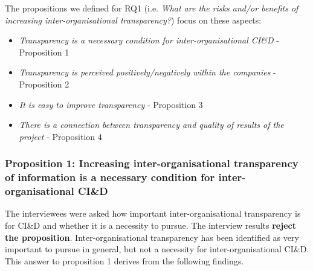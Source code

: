 The propositions we defined for  
RQ1 (i.e. {\em What are the risks and/or benefits of increasing inter-organisational transparency?}) focus on these aspects:

\begin{itemize}
\item {\em Transparency is a necessary condition for  inter-organisational CI\&D} - Proposition 1 %
\item {\em Transparency is perceived positively/negatively within the companies} - Proposition 2 %
\item {\em It is easy to improve transparency} - Proposition 3 %
\item {\em There is a connection between transparency and quality of results of the project} - Proposition 4 %
\end{itemize}

\vspace{.2cm}
\subsubsection{Proposition 1: Increasing inter-organisational transparency of information is a necessary condition for inter-organisational CI\&D}

The interviewees were asked how important inter-organisational transparency is for CI\&D and whether it is a necessity to pursue. 
The interview results {\bf reject the proposition}. Inter-organisational transparency has been identified as very important to pursue in general, but not a necessity for inter-organisational CI\&D. This answer to proposition 1 derives from the following findings.

